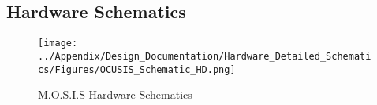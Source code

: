 \subsection{Hardware Schematics}
\begin{figure}[H]
  \begin{center}
    \texttt{[image: ../Appendix/Design\_Documentation/Hardware\_Detailed\_Schematics/Figures/OCUSIS\_Schematic\_HD.png]}
  \caption{M.O.S.I.S Hardware Schematics}
    \end{center}
\end{figure}